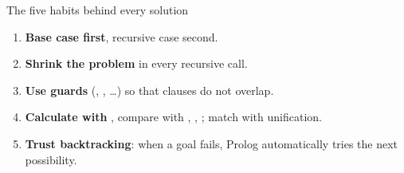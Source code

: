 \documentclass[11pt,a4paper]{article}
\newcommand{\pred}[1]{\texttt{\detokenize{#1}}}
\begin{document}
\begin{defbox}{The five habits behind every solution}
\begin{enumerate}[leftmargin=*]
  \item \textbf{Base case first}, recursive case second.
  \item \textbf{Shrink the problem} in every recursive call.
  \item \textbf{Use guards} (\pred{N > 0}, \pred{H \= E}, \dots) so that clauses do not overlap.
  \item \textbf{Calculate with \pred{is}}, compare with \pred{=:=}, \pred{<}, \pred{=<}; match with unification.
  \item \textbf{Trust backtracking}: when a goal fails, Prolog automatically tries the next possibility.
\end{enumerate}
\end{defbox}
\end{document}
